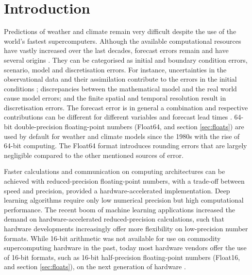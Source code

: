 \section{Introduction}

Predictions of weather and climate remain very difficult despite the use of the world's fastest supercomputers. Although the available
computational resources have vastly increased over the last decades, forecast errors remain and have several origins
\citep{Palmer2012,Palmer2015}. They can be categorised as initial and boundary condition errors, scenario, model and discretisation
errors. For instance, uncertainties in the observational data and their assimilation contribute to the errors in the initial conditions
\citep{Ghil1991}; discrepancies between the mathematical model and the real world cause model errors; and the finite spatial and
temporal resolution result in discretisation errors. The forecast error is in general a combination and respective contributions can be
different for different variables and forecast lead times \citep{Jung2010,Palmer2019a}. 64-bit double-precision floating-point numbers
(Float64, \cite{IEEE1985} and section \ref{sec:floats}) are used by default for weather and climate models since the 1980s with the
rise of 64-bit computing. The Float64 format introduces rounding errors \citep{Higham2002} that are largely negligible compared
to the other mentioned sources of error.

Faster calculations and communication on computing architectures can be achieved with reduced-precision floating-point numbers,
with a trade-off between speed and precision, provided a hardware-accelerated implementation. Deep learning algorithms require
only low numerical precision \citep{Wang2018,Sun2020} but high computational performance. The recent boom of machine learning
applications increased the demand on hardware-accelerated reduced-precision calculations, such that hardware developments
increasingly offer more flexibility on low-precision number formats. While 16-bit arithmetic was not available for use on commodity
supercomputing hardware in the past, today most hardware vendors offer the use of 16-bit formats, such as 16-bit half-precision
floating-point numbers (Float16, \cite{IEEE2008} and section \ref{sec:floats}), on the next generation of hardware
\citep{Sato2020,Burgess2019}.

